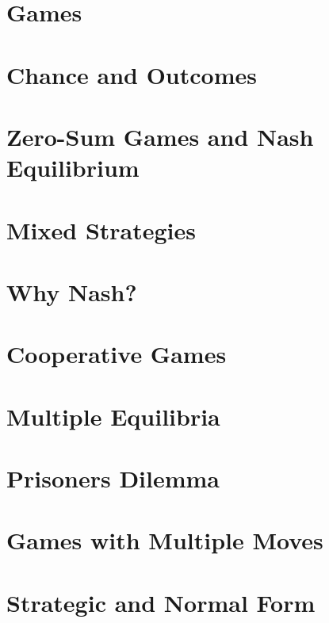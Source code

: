\section{Games}

\section{Chance and Outcomes}

\section{Zero-Sum Games and Nash Equilibrium}

\section{Mixed Strategies}

\section{Why Nash?}


\section{Cooperative Games}

\section{Multiple Equilibria}

\section{Prisoners Dilemma}


\section{Games with Multiple Moves}

\section{Strategic and Normal Form}

